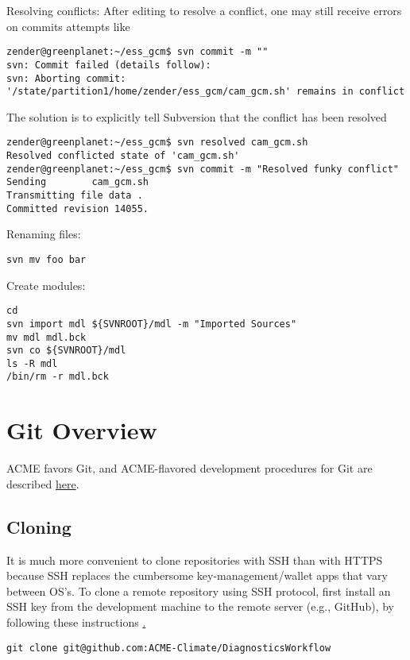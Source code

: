 \documentclass[12pt,twoside]{article}
\begin{document}
Resolving conflicts:
After editing to resolve a conflict, one may still receive errors
on commits attempts like
\begin{verbatim}
zender@greenplanet:~/ess_gcm$ svn commit -m ""
svn: Commit failed (details follow):
svn: Aborting commit: '/state/partition1/home/zender/ess_gcm/cam_gcm.sh' remains in conflict
\end{verbatim}
The solution is to explicitly tell Subversion that the conflict has
been resolved
\begin{verbatim}
zender@greenplanet:~/ess_gcm$ svn resolved cam_gcm.sh
Resolved conflicted state of 'cam_gcm.sh'
zender@greenplanet:~/ess_gcm$ svn commit -m "Resolved funky conflict"
Sending        cam_gcm.sh
Transmitting file data .
Committed revision 14055.
\end{verbatim}

Renaming files:
\begin{verbatim}
svn mv foo bar
\end{verbatim}

Create modules:
\begin{verbatim}
cd
svn import mdl ${SVNROOT}/mdl -m "Imported Sources"
mv mdl mdl.bck
svn co ${SVNROOT}/mdl
ls -R mdl
/bin/rm -r mdl.bck
\end{verbatim}

\section{Git Overview}\label{sxn:git}

ACME favors Git, and ACME-flavored development procedures for Git are
described
\href{https://acme-climate.atlassian.net/wiki/display/Docs/Development+Quick+Guide}{here}. 

\subsection{Cloning}\label{sxn:git_cln}

It is much more convenient to clone repositories with SSH 
than with HTTPS because SSH replaces the cumbersome
key-management/wallet apps that vary between OS's. 
To clone a remote repository using SSH protocol, first install
an SSH key from the development machine to the remote server (e.g.,
GitHub), by following these instructions
\href{https://help.github.com/articles/generating-ssh-keys}.
\begin{verbatim}
git clone git@github.com:ACME-Climate/DiagnosticsWorkflow
\end{verbatim}
\end{document}
